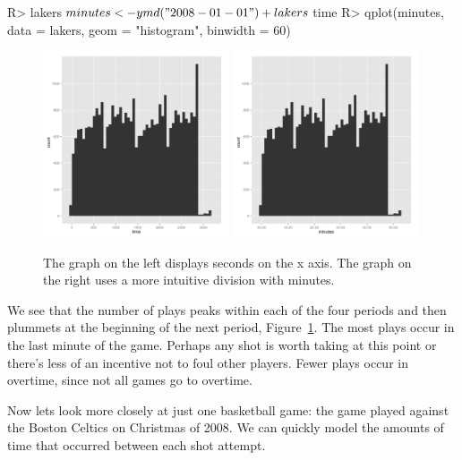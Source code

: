 \documentclass[article]{jss}
\begin{document}
\begin{CodeInput}
R> lakers$minutes <- ymd("2008-01-01") + lakers$time
R> qplot(minutes, data = lakers, geom = "histogram", binwidth = 60)
\end{CodeInput}

\begin{figure}[htpb]
  \centering
  \includegraphics[width=0.49\textwidth]{play-time-histogram.png}        
  \includegraphics[width=0.49\textwidth]{play-time-histogram2.png} 
  \caption{The graph on the left displays seconds on the x axis. The graph on the right uses a more intuitive division with minutes.}
  \label{fig:plays}
\end{figure}

We see that the number of plays peaks within each of the four periods and then plummets at the beginning of the next period, Figure~\ref{fig:plays}. The most plays occur in the last minute of the game. Perhaps any shot is worth taking at this point or there's less of an incentive not to foul other players. Fewer plays occur in overtime, since not all games go to overtime.

Now lets look more closely at just one basketball game: the game played against the Boston Celtics on Christmas of 2008. We can quickly model the amounts of time that occurred between each shot attempt.
\end{document}
